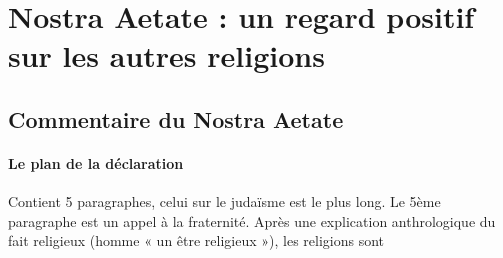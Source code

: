  
 \section{Nostra Aetate : un regard positif sur les autres religions}
 
 \subsection{Commentaire du Nostra Aetate}
 
 \paragraph{Le plan de la déclaration}  Contient 5 paragraphes, celui sur le judaïsme est le plus long.
Le 5ème paragraphe est un appel à la fraternité.
 Après une explication anthrologique du fait religieux (homme « un être religieux »), les religions sont 


